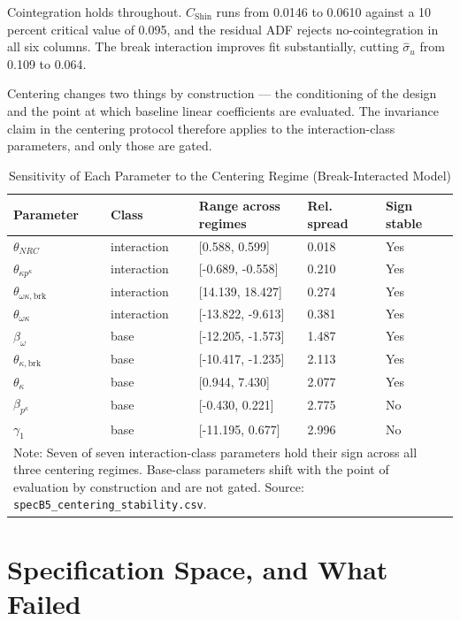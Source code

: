 \documentclass[11pt,a4paper]{article}
\begin{document}
Cointegration holds throughout. $C_{\text{Shin}}$ runs from 0.0146 to 0.0610 against a 10 percent critical value of 0.095, and the residual ADF rejects no-cointegration in all six columns. The break interaction improves fit substantially, cutting $\hat{\sigma}_u$ from 0.109 to 0.064.

Centering changes two things by construction --- the conditioning of the design and the point at which baseline linear coefficients are evaluated. The invariance claim in the centering protocol therefore applies to the interaction-class parameters, and only those are gated.

\begin{table}[H]
\centering
\caption{Sensitivity of Each Parameter to the Centering Regime (Break-Interacted Model)}
\label{tab:centering}
\small
\begin{tabular}{p{4.2cm}p{2.2cm}p{4.0cm}p{2.0cm}p{1.7cm}}
\toprule
Parameter & Class & Range across regimes & Rel. spread & Sign stable \\
\midrule
$\theta_{NRC}$ & interaction & [0.588, 0.599] & 0.018 & Yes \\
$\theta_{\kappa p^{\kappa}}$ & interaction & [-0.689, -0.558] & 0.210 & Yes \\
$\theta_{\omega\kappa,\text{brk}}$ & interaction & [14.139, 18.427] & 0.274 & Yes \\
$\theta_{\omega\kappa}$ & interaction & [-13.822, -9.613] & 0.381 & Yes \\
\midrule
$\beta_{\omega}$ & base & [-12.205, -1.573] & 1.487 & Yes \\
$\theta_{\kappa,\text{brk}}$ & base & [-10.417, -1.235] & 2.113 & Yes \\
$\theta_{\kappa}$ & base & [0.944, 7.430] & 2.077 & Yes \\
$\beta_{p^{\kappa}}$ & base & [-0.430, 0.221] & 2.775 & No \\
$\gamma_1$ & base & [-11.195, 0.677] & 2.996 & No \\
\bottomrule
\multicolumn{5}{p{15.5cm}}{\footnotesize Note: Seven of seven interaction-class parameters hold their sign across all three centering regimes. Base-class parameters shift with the point of evaluation by construction and are not gated. Source: \texttt{specB5\_centering\_stability.csv}.}
\end{tabular}
\end{table}

\FloatBarrier
\section{Specification Space, and What Failed}
\end{document}
